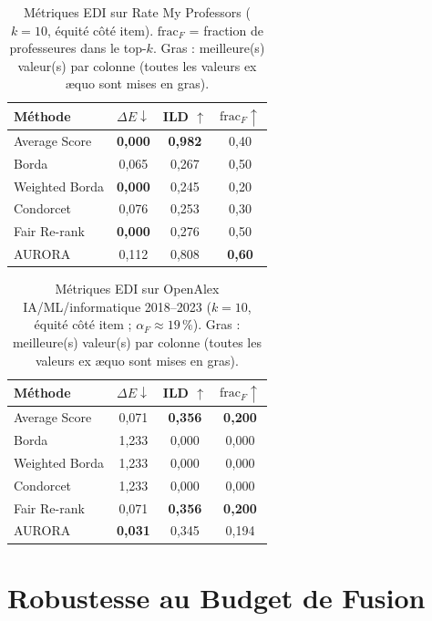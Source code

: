 \documentclass[12pt]{report}
\begin{document}
\begin{table}[h!]
\caption{Métriques EDI sur Rate My Professors ($k=10$, équité côté item).
$\mathrm{frac}_F$ = fraction de professeures dans le top-$k$.
Gras : meilleure(s) valeur(s) par colonne (toutes les valeurs ex æquo
sont mises en gras).}
\label{tab:rmp}
\centering
\begin{tabular}{lccc}
\hline
Méthode & $\Delta E \downarrow$ & ILD $\uparrow$ &
$\mathrm{frac}_F \uparrow$ \\
\hline
Average Score  & \textbf{0,000} & \textbf{0,982} & 0,40 \\
Borda          & 0,065 & 0,267 & 0,50 \\
Weighted Borda & \textbf{0,000} & 0,245 & 0,20 \\
Condorcet      & 0,076 & 0,253 & 0,30 \\
Fair Re-rank   & \textbf{0,000} & 0,276 & 0,50 \\
AURORA           & 0,112 & 0,808 & \textbf{0,60} \\
\hline
\end{tabular}
\end{table}
\FloatBarrier
\begin{table}[h!]
\caption{Métriques EDI sur OpenAlex IA/ML/informatique 2018--2023
($k=10$, équité côté item ; $\alpha_F \approx 19\,\%$). Gras :
meilleure(s) valeur(s) par colonne (toutes les valeurs ex æquo sont
mises en gras).}
\label{tab:oalex}
\centering
\begin{tabular}{lccc}
\hline
Méthode & $\Delta E \downarrow$ & ILD $\uparrow$ &
$\mathrm{frac}_F \uparrow$ \\
\hline
Average Score  & 0,071 & \textbf{0,356} & \textbf{0,200} \\
Borda          & 1,233 & 0,000 & 0,000 \\
Weighted Borda & 1,233 & 0,000 & 0,000 \\
Condorcet      & 1,233 & 0,000 & 0,000 \\
Fair Re-rank   & 0,071 & \textbf{0,356} & \textbf{0,200} \\
AURORA           & \textbf{0,031} & 0,345 & 0,194 \\
\hline
\end{tabular}
\end{table}
\FloatBarrier

\section{Robustesse au Budget de Fusion}
\label{sec:robustness}
\end{document}
